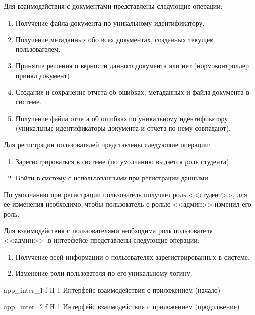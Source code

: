 Для взаимодействия с документами представлены следующие операции:
\begin{enumerate}
	\item Получение файла документа по уникальному идентификатору.
	\item Получение метаданных обо всех документах, созданных текущем пользователем.
	\item Принятие решения о верности данного документа или нет (нормоконтроллер принял документ).
	\item Создание и сохранение отчета об ошибках, метаданных и файла документа в системе.
	\item Получение файла отчета об ошибках по уникальному идентификатору (уникальные идентификаторы документа и отчета по нему совпадают).
\end{enumerate}

Для регистрации пользователей представлены следующие операции:
\begin{enumerate}
	\item Зарегистрироваться в системе (по умолчанию выдается роль студента).
	\item Войти в систему с использованными при регистрации данными.
\end{enumerate}
По умолчанию при регистрации пользователь получает роль <<студент>>, для ее изменения необходимо, чтобы пользователь с ролью <<админ>> изменил его роль.

Для взаимодействия с пользователями необходима роль пользователя <<админ>> ,в интерфейсе представлены следующие операции:
\begin{enumerate}
	\item Получение всей информации о пользователях зарегистрированных в системе.
	\item Изменение роли пользователя по его уникальному логину.
\end{enumerate}



{app_inter_1} %
{f} %
{H} %
{1\textwidth} %
{Интерфейс взаимодействия с приложением (начало)} %


{app_inter_2} %
{f} %
{H} %
{1\textwidth} %
{Интерфейс взаимодействия с приложением (продолжение)} %













